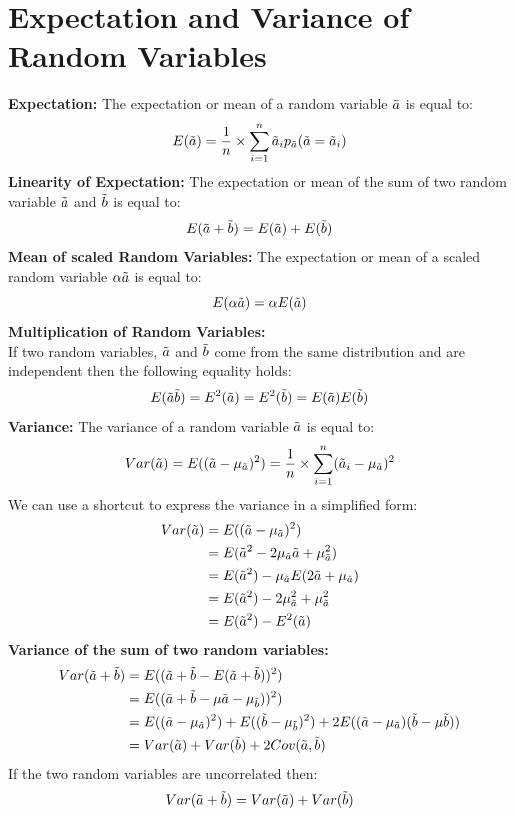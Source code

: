\documentclass[12pt,twoside]{article}
\newcommand{\rnd}{\Tilde}
\newcommand{\ra}{\rnd{ a}  }
\newcommand{\rb}{\rnd{ b}  }
\begin{document}
\section*{Expectation and Variance of Random Variables}
\textbf{Expectation:}
The expectation or mean of a random variable $\ra$ is equal to:
$$
    E(\ra) = \frac{1}{n} \times \sum_{i=1}^n \ra_i p_{\ra}(\ra = \ra_i)
$$
\textbf{Linearity of Expectation:}
The expectation or mean of the sum of two random variable $\ra$ and $\rb$ is equal to:
$$
    E(\ra+\rb) = E(\ra)+E(\rb)
$$
\textbf{Mean of scaled Random Variables:}
The expectation or mean of a scaled random variable $\alpha\ra$ is equal to:
$$
    E(\alpha\ra) = \alpha E(\ra)
$$
\textbf{Multiplication of Random Variables:}\\
If two random variables, $\ra$ and $\rb$ come from the same distribution and are independent then the following equality holds:
$$
    E(\ra \rb) = E^2(\ra) = E^2(\rb) = E(\ra)E(\rb)
$$
\textbf{Variance:}
The variance of a random variable $\ra$ is equal to:
$$
    Var(\ra) = E((\ra-\mu_{\ra})^2) = \frac{1}{n} \times \sum_{i=1}^n (\ra_i-\mu_{\ra})^2 
$$
We can use a shortcut to express the variance in a simplified form:
\begin{equation}
    \begin{split}
        Var(\ra) &= E((\ra-\mu_{\ra})^2) \\
        &= E(\ra^2 - 2\mu_{\ra}\ra + \mu_{\ra}^2) \\
        &= E(\ra^2) - \mu_{\ra}E(2\ra + \mu_{\ra}) \\   
        &= E(\ra^2) - 2\mu_{\ra}^2 + \mu_{\ra}^2 \\ 
        &= E(\ra^2) - E^2(\ra)
    \end{split}
\end{equation}
\textbf{Variance of the sum of two random variables:}
\begin{equation}
    \begin{split}
        Var(\ra+\rb) &= E((\ra+\rb-E(\ra+\rb))^2) \\
        &= E((\ra+\rb-\mu{\ra}-\mu_{\rb}))^2) \\
        &= E((\ra-\mu_{\ra})^2) + E((\rb-\mu_{\rb})^2) + 2E((\ra-\mu_{\ra})(\rb - \mu{\rb})) \\   
        &= Var(\ra) + Var(\rb) +2Cov(\ra,\rb) 
    \end{split}
\end{equation}
If the two random variables are uncorrelated then:
$$
    Var(\ra+\rb) = Var(\ra) + Var(\rb)
$$
\end{document}
